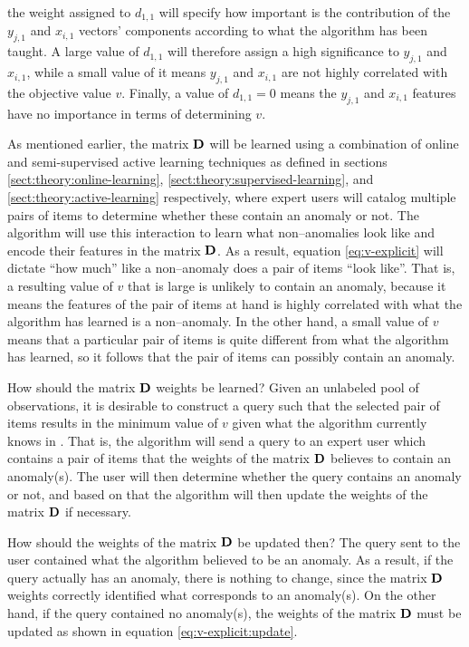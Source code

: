 the weight assigned to $d_{1,1}$ will specify how important is the contribution of the $y_{j,1}$ and $x_{i,1}$ vectors' components according to what the \mlblink algorithm has been taught. A large value of $d_{1,1}$ will therefore assign a high significance to $y_{j,1}$ and $x_{i,1}$, while a small value of it means $y_{j,1}$ and $x_{i,1}$ are not highly correlated with the objective value $v$. Finally, a value of $d_{1,1} = 0$ means the $y_{j,1}$ and $x_{i,1}$ features have no importance in terms of determining $v$.  \newline

As mentioned earlier, the matrix $\boldsymbol{\mathbf{D}}$ will be learned using a combination of online and semi-supervised active learning techniques as defined in sections \ref{sect:theory:online-learning}, \ref{sect:theory:supervised-learning}, and \ref{sect:theory:active-learning} respectively, where expert users will catalog multiple pairs of items to determine whether these contain an anomaly or not. The \mlblink algorithm will use this interaction to learn what non--anomalies look like and encode their features in the matrix $\boldsymbol{\mathbf{D}}$. As a result, equation \ref{eq:v-explicit} will dictate ``how much'' like a non--anomaly does a pair of items ``look like''. That is, a resulting value of $v$ that is large is unlikely to contain an anomaly, because it means the features of the pair of items at hand is highly correlated with what the \mlblink algorithm has learned is a non--anomaly. In the other hand, a small value of $v$ means that a particular pair of items is quite different from what the \mlblink algorithm has learned, so it follows that the pair of items can possibly contain an anomaly.  \newline

How should the matrix $\boldsymbol{\mathbf{D}}$ weights be learned? Given an unlabeled pool of observations, it is desirable to construct a query such that the selected pair of items results in the minimum value of $v$ given what the \mlblink algorithm currently knows in . That is, the \mlblink algorithm will send a query to an expert user which contains a pair of items that the weights of the matrix $\boldsymbol{\mathbf{D}}$ believes to contain an anomaly(s). The user will then determine whether the query contains an anomaly or not, and based on that the \mlblink algorithm will then update the weights of the matrix $\boldsymbol{\mathbf{D}}$ if necessary.  \newline

How should the weights of the matrix $\boldsymbol{\mathbf{D}}$ be updated then? The query sent to the user contained what the \mlblink algorithm believed to be an anomaly. As a result, if the query actually has an anomaly, there is nothing to change, since the matrix $\boldsymbol{\mathbf{D}}$ weights correctly identified what corresponds to an anomaly(s). On the other hand, if the query contained no anomaly(s), the weights of the matrix $\boldsymbol{\mathbf{D}}$ must be updated as shown in equation \ref{eq:v-explicit:update}.

